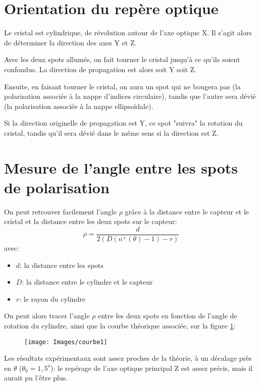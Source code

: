 \documentclass[a4paper,11pt]{report}
\begin{document}
\section{Orientation du repère optique}
Le cristal est cylindrique, de révolution autour de l'axe optique X. Il s'agit alors de déterminer la direction des axes Y et Z.

Avec les deux spots allumés, on fait tourner le cristal jusqu'à ce qu'ils soient confondus. La direction de propagation est alors soit Y soit Z.

Ensuite, en faisant tourner le cristal, on aura un spot qui ne bougera pas (la polarisation associée à la nappe d'indices circulaire), tandis que l'autre sera dévié (la polarisation associée à la nappe ellipsoïdale).

Si la direction originelle de propagation est Y, ce spot "suivra" la rotation du cristal, tandis qu'il sera dévié dans le même sens si la direction est Z.

\section{Mesure de l'angle entre les spots de polarisation}
On peut retrouver facilement l'angle $\rho$ grâce à la distance entre le capteur et le cristal et la distance entre les deux spots sur le capteur: 
\[  \rho = \frac{d}{2(D(n^+(\theta)-1)-r)} \]
avec:
\begin{itemize}
    \item $d$: la distance entre les spots
    \item $D$: la distance entre le cylindre et le capteur
    \item $r$: le rayon du cylindre
\end{itemize}
\vspace*{0.5cm}
On peut alors tracer l'angle $\rho$ entre les deux spots en fonction de l'angle de rotation du cylindre, ainsi que la courbe théorique associée, sur la figure \ref{courbe1}:

\begin{figure}[h]
    \begin{center}
        \texttt{[image: Images/courbe1]}
        \caption{}
        \label{courbe1}
    \end{center}
\end{figure}

Les résultats expérimentaux sont assez proches de la théorie, à un décalage près en $\theta$ ($\theta_0 = 1,5^o$): le repérage de l'axe optique principal Z est assez précis, mais il aurait pu l'être plus.
\end{document}
